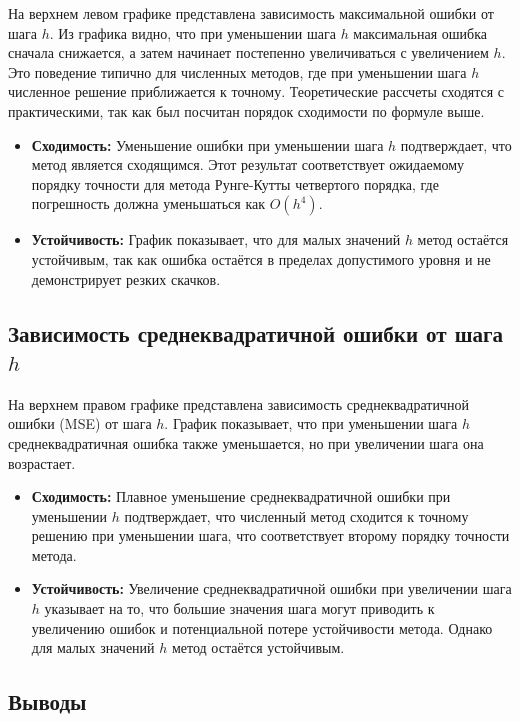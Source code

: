\documentclass{article}
\begin{document}
На верхнем левом графике представлена зависимость максимальной ошибки от шага \( h \). Из графика видно, что при уменьшении шага \( h \) максимальная ошибка сначала снижается, а затем начинает постепенно увеличиваться с увеличением \( h \). Это поведение типично для численных методов, где при уменьшении шага \( h \) численное решение приближается к точному. Теоретические рассчеты сходятся с практическими, так как был посчитан порядок сходимости по формуле выше.

\begin{itemize}
    \item \textbf{Сходимость:} Уменьшение ошибки при уменьшении шага \( h \) подтверждает, что метод является сходящимся. Этот результат соответствует ожидаемому порядку точности для метода Рунге-Кутты четвертого порядка, где погрешность должна уменьшаться как \( O(h^4) \).
    \item \textbf{Устойчивость:} График показывает, что для малых значений \( h \) метод остаётся устойчивым, так как ошибка остаётся в пределах допустимого уровня и не демонстрирует резких скачков.
\end{itemize}

\subsection{Зависимость среднеквадратичной ошибки от шага \( h \)}

На верхнем правом графике представлена зависимость среднеквадратичной ошибки (MSE) от шага \( h \). График показывает, что при уменьшении шага \( h \) среднеквадратичная ошибка также уменьшается, но при увеличении шага она возрастает.

\begin{itemize}
    \item \textbf{Сходимость:} Плавное уменьшение среднеквадратичной ошибки при уменьшении \( h \) подтверждает, что численный метод сходится к точному решению при уменьшении шага, что соответствует второму порядку точности метода.
    \item \textbf{Устойчивость:} Увеличение среднеквадратичной ошибки при увеличении шага \( h \) указывает на то, что большие значения шага могут приводить к увеличению ошибок и потенциальной потере устойчивости метода. Однако для малых значений \( h \) метод остаётся устойчивым.
\end{itemize}



\subsection{Выводы}
\end{document}
